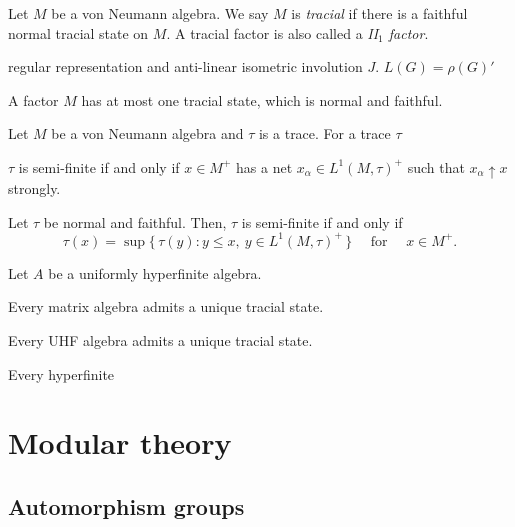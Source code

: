 \documentclass{../../large}
\begin{document}
\begin{prb}
Let $M$ be a von Neumann algebra.
We say $M$ is \emph{tracial} if there is a faithful normal tracial state on $M$.
A tracial factor is also called a \emph{II$_1$ factor}.
\begin{parts}
\item regular representation and anti-linear isometric involution $J$. $L(G)=\rho(G)'$
\item A factor $M$ has at most one tracial state, which is normal and faithful.
\end{parts}
\end{prb}





\begin{prb}
Let $M$ be a von Neumann algebra and $\tau$ is a trace.
For a trace $\tau$
\begin{parts}
\item $\tau$ is semi-finite if and only if $x\in M^+$ has a net $x_\alpha\in L^1(M,\tau)^+$ such that $x_\alpha\uparrow x$ strongly.
\item Let $\tau$ be normal and faithful. Then, $\tau$ is semi-finite if and only if
\[\tau(x)=\sup\{\,\tau(y):y\le x,\ y\in L^1(M,\tau)^+\,\}\quad\text{ for }\quad x\in M^+.\]
\end{parts}
\end{prb}

\begin{prb}
Let $A$ be a uniformly hyperfinite algebra.
\begin{parts}
\item Every matrix algebra admits a unique tracial state.
\item Every UHF algebra admits a unique tracial state.
\item Every hyperfinite 
\end{parts}
\end{prb}









\chapter{Modular theory}



\section{Automorphism groups}
\end{document}
